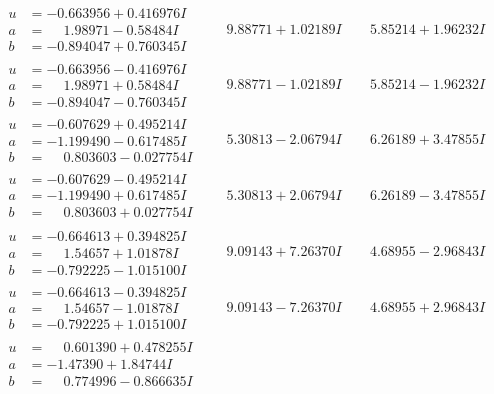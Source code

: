 \documentclass[1p]{elsarticle_modified}
\theoremstyle{definition}
\begin{document}
$$\begin{array}{c|c|c}
\begin{aligned}
u &= -0.663956 + 0.416976 I \\
a &= \phantom{-}1.98971 - 0.58484 I \\
b &= -0.894047 + 0.760345 I\end{aligned}
 & \phantom{-}9.88771 + 1.02189 I & \phantom{-}5.85214 + 1.96232 I \\ \hline\begin{aligned}
u &= -0.663956 - 0.416976 I \\
a &= \phantom{-}1.98971 + 0.58484 I \\
b &= -0.894047 - 0.760345 I\end{aligned}
 & \phantom{-}9.88771 - 1.02189 I & \phantom{-}5.85214 - 1.96232 I \\ \hline\begin{aligned}
u &= -0.607629 + 0.495214 I \\
a &= -1.199490 - 0.617485 I \\
b &= \phantom{-}0.803603 - 0.027754 I\end{aligned}
 & \phantom{-}5.30813 - 2.06794 I & \phantom{-}6.26189 + 3.47855 I \\ \hline\begin{aligned}
u &= -0.607629 - 0.495214 I \\
a &= -1.199490 + 0.617485 I \\
b &= \phantom{-}0.803603 + 0.027754 I\end{aligned}
 & \phantom{-}5.30813 + 2.06794 I & \phantom{-}6.26189 - 3.47855 I \\ \hline\begin{aligned}
u &= -0.664613 + 0.394825 I \\
a &= \phantom{-}1.54657 + 1.01878 I \\
b &= -0.792225 - 1.015100 I\end{aligned}
 & \phantom{-}9.09143 + 7.26370 I & \phantom{-}4.68955 - 2.96843 I \\ \hline\begin{aligned}
u &= -0.664613 - 0.394825 I \\
a &= \phantom{-}1.54657 - 1.01878 I \\
b &= -0.792225 + 1.015100 I\end{aligned}
 & \phantom{-}9.09143 - 7.26370 I & \phantom{-}4.68955 + 2.96843 I \\ \hline\begin{aligned}
u &= \phantom{-}0.601390 + 0.478255 I \\
a &= -1.47390 + 1.84744 I \\
b &= \phantom{-}0.774996 - 0.866635 I\end{aligned}

\end{array}$$
\end{document}
